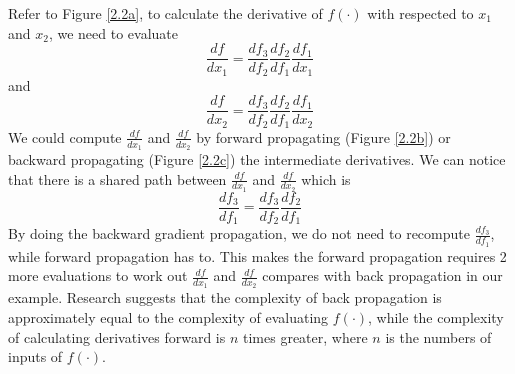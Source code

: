 Refer to Figure \ref{2.2a}, to calculate the derivative of $f(\cdot)$ with respected to $x_{1}$ and $x_{2}$, we need to evaluate
\begin{equation}\label{x_1}
\frac{df}{dx_{1}} = \frac{df_{3}}{df_{2}}\frac{df_{2}}{df_{1}}\frac{df_{1}}{dx_{1}}
\end{equation}
and
\begin{equation}\label{x_2}
\frac{df}{dx_{2}} = \frac{df_{3}}{df_{2}}\frac{df_{2}}{df_{1}}\frac{df_{1}}{dx_{2}}
\end{equation}
We could compute $\frac{df}{dx_{1}}$ and $\frac{df}{dx_{2}}$ by forward propagating (Figure \ref{2.2b}) or backward propagating (Figure \ref{2.2c}) the intermediate derivatives. 
We can notice that there is a shared path between $\frac{df}{dx_{1}}$ and $\frac{df}{dx_{2}}$ which is 
\begin{equation}
\frac{df_{3}}{df_{1}} = \frac{df_{3}}{df_{2}}\frac{df_{2}}{df_{1}}  
\end{equation}
By doing the backward gradient propagation, we do not need to recompute $\frac{df_{3}}{df_{1}}$, while forward propagation has to.
This makes the forward propagation requires 2 more evaluations to work out $\frac{df}{dx_{1}}$ and $\frac{df}{dx_{2}}$ compares with back propagation in our example.
Research suggests that the complexity of back propagation is approximately equal to the complexity of evaluating $f(\cdot)$, while the complexity of calculating derivatives forward is $n$ times greater\cite{naumann2012art}, where $n$ is the numbers of inputs of $f(\cdot)$.
